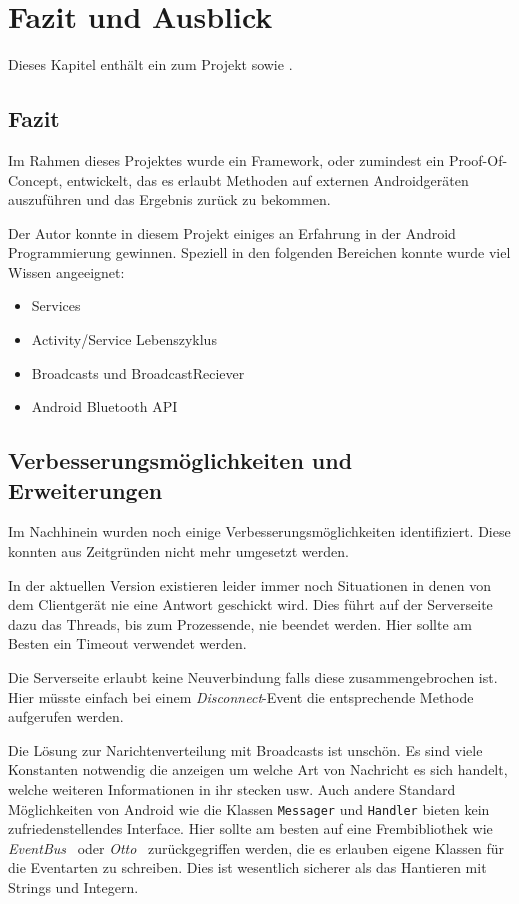 \chapter{Fazit und Ausblick}\label{chap:fazit}
%
Dieses Kapitel enthält ein  zum Projekt sowie .
%
\section{Fazit}\label{sec:fazit}
%
Im Rahmen dieses Projektes wurde ein Framework, oder zumindest ein Proof-Of-Concept, entwickelt, das es erlaubt Methoden auf externen Androidgeräten auszuführen und das Ergebnis zurück zu bekommen.

Der Autor konnte in diesem Projekt einiges an Erfahrung in der Android Programmierung gewinnen. Speziell in den folgenden Bereichen konnte wurde viel Wissen angeeignet:
\begin{itemize}
  \item Services
  \item Activity/Service Lebenszyklus
  \item Broadcasts und BroadcastReciever
  \item Android Bluetooth API
\end{itemize}

\section{Verbesserungsmöglichkeiten und Erweiterungen}\label{sec:ve}
%
Im Nachhinein wurden noch einige Verbesserungsmöglichkeiten identifiziert. Diese konnten aus Zeitgründen nicht mehr umgesetzt werden.

In der aktuellen Version existieren leider immer noch Situationen in denen von dem Clientgerät nie eine Antwort geschickt wird. Dies führt auf der Serverseite dazu das Threads, bis zum Prozessende, nie beendet werden. Hier sollte am Besten ein Timeout verwendet werden.

Die Serverseite erlaubt keine Neuverbindung falls diese zusammengebrochen ist. Hier müsste einfach bei einem \emph{Disconnect}-Event die entsprechende Methode aufgerufen werden.

Die Lösung zur Narichtenverteilung mit Broadcasts ist unschön. Es sind viele Konstanten notwendig die anzeigen um welche Art von Nachricht es sich handelt, welche weiteren Informationen in ihr stecken usw. Auch andere Standard Möglichkeiten von Android wie die Klassen \lstinline{Messager} und \lstinline{Handler} bieten kein zufriedenstellendes Interface. Hier sollte am besten auf eine Frembibliothek wie \emph{EventBus}~\cite{greenrobot2015} oder \emph{Otto}~\cite{Square2013} zurückgegriffen werden, die es erlauben eigene Klassen für die Eventarten zu schreiben. Dies ist wesentlich sicherer als das Hantieren mit Strings und Integern.

